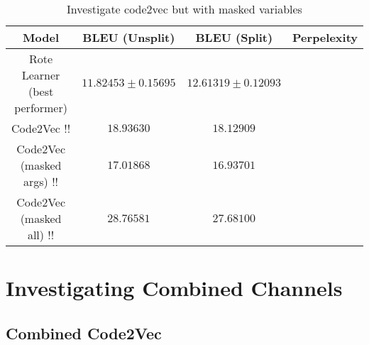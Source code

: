 \begin{table}[ht!]
\begin{center}
\begin{tabular}{ c | c | c | c }
    Model                             & BLEU (Unsplit)  & BLEU (Split)    & Perpelexity \\
    \hline
    Rote Learner (best performer)          & $ 11.82453 \pm  0.15695 $ & $ 12.61319 \pm 0.12093 $ & \\
    \hline
    Code2Vec                !!              & $ 18.93630 $ & $ 18.12909 $ & \\
    Code2Vec (masked args)  !!              & $ 17.01868 $ & $ 16.93701 $ & \\                  
    Code2Vec (masked all)   !!              & $ 28.76581 $ & $ 27.68100 $ & \\

    \hline
\end{tabular}
\caption {Investigate code2vec but with masked variables}
\label{table:code_2_vec_masked}
\end{center}
\end{table}


\section{Investigating Combined Channels} %
\label{sec:investigating_combined_channels}


\subsection{Combined Code2Vec } %
\label{sub:combined_code2vec}


